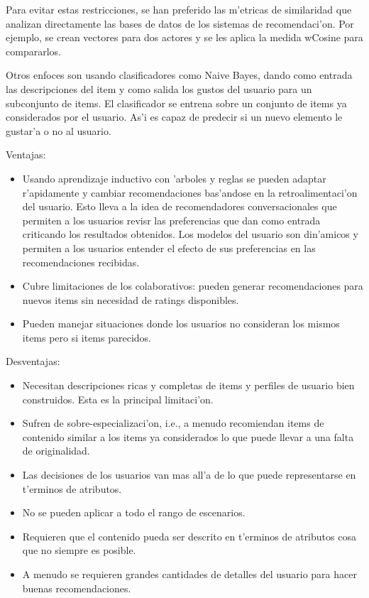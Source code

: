 \documentclass[11pt]{article}
\begin{document}
Para evitar estas restricciones, se han preferido las m'etricas de similaridad que analizan directamente las bases de datos de los sistemas de recomendaci'on. Por ejemplo, se crean vectores para dos actores y se les aplica la medida wCosine para compararlos.

Otros enfoces son usando clasificadores como Naive Bayes, dando como entrada las descripciones del item y como salida los gustos del usuario para un subconjunto de items. El clasificador se entrena sobre un conjunto de items ya considerados por el usuario. As'i es capaz de predecir si un nuevo elemento le gustar'a o no al usuario.

Ventajas:
\begin{itemize}
\item  Usando aprendizaje inductivo con 'arboles y reglas se pueden adaptar r'apidamente y cambiar recomendaciones bas'andose en la retroalimentaci'on del usuario. Esto lleva a la idea de recomendadores conversacionales que permiten a los usuarios revisr las preferencias que dan como entrada criticando los resultados obtenidos. Los modelos del usuario son din'amicos y permiten a los usuarios entender el efecto de sus preferencias en las recomendaciones recibidas. 
\item Cubre limitaciones de los colaborativos: pueden generar recomendaciones para nuevos items sin necesidad de ratings disponibles.
\item Pueden manejar situaciones donde los usuarios no consideran los mismos items pero si items parecidos.
\end{itemize}

Desventajas:
\begin{itemize}
\item Necesitan descripciones ricas y completas de items y perfiles de usuario bien construidos. Esta es la principal limitaci'on.
\item Sufren de sobre-especializaci'on, i.e., a menudo recomiendan items de contenido similar a los items ya considerados lo que puede llevar a una falta de originalidad.
\item Las decisiones de los usuarios van mas all'a de lo que puede representarse en t'erminos de atributos.
\item No se pueden aplicar a todo el rango de escenarios.
\item Requieren que el contenido pueda ser descrito en t'erminos de atributos cosa que no siempre es posible.
\item A menudo se requieren grandes cantidades de detalles del usuario para hacer buenas recomendaciones.
\end{itemize}
\end{document}
